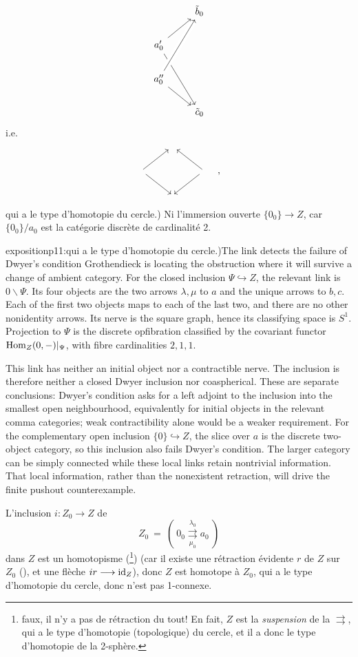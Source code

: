 \[
\begin{tikzcd}
& \tilde{b}_0 \\
a'_0 \arrow[ur] \arrow[ddr] & \\
a''_0 \arrow[uur, crossing over] \arrow[dr] & \\
& \tilde{c}_0
\end{tikzcd}
\]
i.e.
\[
\begin{tikzcd}
& {} & \\
{} \arrow[ur] \arrow[dr] & & {} \arrow[ul] \arrow[dl] \\
& {} &
\end{tikzcd}
\quad ,
\]
qui a le type d'homotopie du cercle.) Ni l'immersion ouverte $\{0_0\} \longrightarrow Z$, car $\{0_0\}/a_0$ est la catégorie discrète de cardinalité 2.

\begin{dcomment}{exposition}{p11:qui a le type d'homotopie du cercle.)}{The link detects the failure of Dwyer's condition}
Grothendieck is locating the obstruction where it will survive a change of ambient category. For the closed inclusion $\Psi\hookrightarrow Z$, the relevant link is $0\backslash\Psi$. Its four objects are the two arrows $\lambda,\mu$ to $a$ and the unique arrows to $b,c$. Each of the first two objects maps to each of the last two, and there are no other nonidentity arrows. Its nerve is the square graph, hence its classifying space is $S^1$. Projection to $\Psi$ is the discrete opfibration classified by the covariant functor $\mathrm{Hom}_Z(0,-)|_\Psi$, with fibre cardinalities $2,1,1$.

This link has neither an initial object nor a contractible nerve. The inclusion is therefore neither a closed Dwyer inclusion nor coaspherical. These are separate conclusions: Dwyer's condition asks for a left adjoint to the inclusion into the smallest open neighbourhood, equivalently for initial objects in the relevant comma categories; weak contractibility alone would be a weaker requirement. For the complementary open inclusion $\{0\}\hookrightarrow Z$, the slice over $a$ is the discrete two-object category, so this inclusion also fails Dwyer's condition. The larger category can be simply connected while these local links retain nontrivial information. That local information, rather than the nonexistent retraction, will drive the finite pushout counterexample.
\end{dcomment}


L'inclusion $i : Z_0 \longrightarrow Z$ de
\[ Z_0 \ = \ (\ 0_0 \overset{\lambda_0}{\underset{\mu_0}{\rightrightarrows}} a_0\ ) \]
dans $Z$ est un homotopisme (\footnote[7]{faux, il n'y a pas de rétraction du tout! En fait, $Z$ est la \textit{suspension} de la $\rightrightarrows$, qui a le type d'homotopie (topologique) du cercle, et il a donc le type d'homotopie de la 2-sphère.}) (car il existe une rétraction évidente $r$ de $Z$ sur $Z_0$ (\footnotemark[7]), et une flèche $ir \longrightarrow \mathrm{id}_Z$), donc $Z$ est homotope à $Z_0$, qui a le type d'homotopie du cercle, donc n'est pas 1-connexe.

